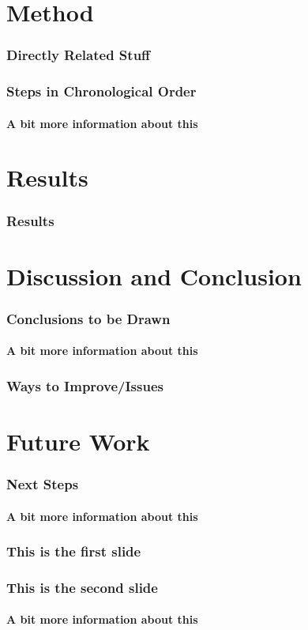 \documentclass{beamer}
\begin{document}
	\section{Method}  
  \begin{frame}
    \frametitle{Directly Related Stuff}
  \end{frame}
  
  \begin{frame}
    \frametitle{Steps in Chronological Order}
    \framesubtitle{A bit more information about this}
  \end{frame}
    
  \section{Results}
  \begin{frame}
    \frametitle{Results}
  \end{frame}
  
  \section{Discussion and Conclusion}
  \begin{frame}
    \frametitle{Conclusions to be Drawn}
    \framesubtitle{A bit more information about this}
  \end{frame}
  
  \begin{frame}
    \frametitle{Ways to Improve/Issues}
  \end{frame}
  
  \section{Future Work}
  \begin{frame}
    \frametitle{Next Steps}
    \framesubtitle{A bit more information about this}
  \end{frame}
  
  \begin{frame}
    \frametitle{This is the first slide}
  \end{frame}
  
  \begin{frame}
    \frametitle{This is the second slide}
    \framesubtitle{A bit more information about this}
  \end{frame}
\end{document}
